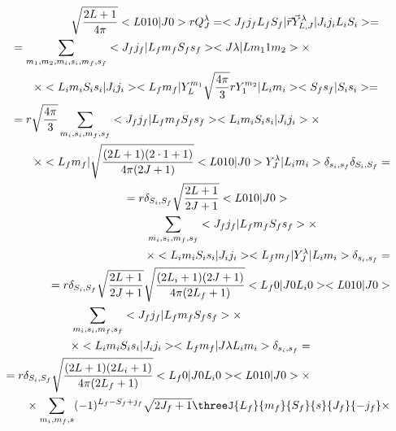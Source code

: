 \begin{align}
    \begin{split}
        &\sqrt{\frac{2L+1}{4\pi}} <L 0 1 0 | J 0> r Q_{J}^\lambda = <J_f j_f L_f S_f|\vec{r} \vec{Y}^{\lambda}_{L, J}|J_i j_i L_i S_i> =
    \end{split} \\
    \begin{split}
        &= \sum_{m_1, m_2, m_i, s_i, m_f, s_f} <J_f j_f| L_f m_f S_f s_f> <J \lambda| L m_1 1 m_2> \times \\
        &\qquad\times <L_i m_i S_i s_i | J_i j_i> <L_f m_f| Y_L^{m_1} \sqrt{\frac{4 \pi}{3}} r Y_{1}^{m_2}|L_i m_i> <S_f s_f|S_i s_i> = \\
        &= r \sqrt{\frac{4 \pi}{3}} \sum_{m_i, s_i, m_f, s_f} <J_f j_f| L_f m_f S_f s_f> <L_i m_i S_i s_i | J_i j_i> \times \\
        &\qquad\times <L_f m_f| \sqrt{\frac{(2L+1)(2\cdot1+1)}{4 \pi (2J + 1)}} <L 0 1 0 | J 0> Y_J^\lambda|L_i m_i> \delta_{s_i, s_f} \delta_{S_i, S_f} = \\
    \end{split} \\
    \begin{split}
        &= r \delta_{S_i, S_f} \sqrt{\frac{2L+1}{2J+1}} <L 0 1 0 | J 0> \\
        &\qquad\sum_{m_i, s_i, m_f, s_f} <J_f j_f| L_f m_f S_f s_f> \times \\
        &\qquad\times <L_i m_i S_i s_i | J_i j_i> <L_f m_f| Y_J^\lambda |L_i m_i> \delta_{s_i, s_f} =
    \end{split} \\
    \begin{split}
        &= r \delta_{S_i, S_f} \sqrt{\frac{2L+1}{2J+1}} \sqrt{\frac{(2L_i+1)(2J+1)}{4 \pi (2L_f+1)}} <L_f 0 | J 0 L_i 0> <L 0 1 0 | J 0> \\
        &\qquad \sum_{m_i, s_i, m_f, s_f} <J_f j_f| L_f m_f S_f s_f> \times \\
        &\qquad\times <L_i m_i S_i s_i | J_i j_i> <L_f m_f| J \lambda L_i m_i> \delta_{s_i, s_f} =
    \end{split} \\
    \begin{split}
        &= r \delta_{S_i, S_f} \sqrt{\frac{(2L+1) (2L_i + 1)}{4 \pi (2L_f+1)}} <L_f 0  | J 0 L_i 0> <L 0 1 0 | J 0> \times \\
        &\qquad\times \sum_{m_i, m_f, s} (-1)^{L_f-S_f + j_f} \sqrt{2J_f+1} \threeJ{L_f}{m_f}{S_f}{s}{J_f}{-j_f} \times \\

\end{split}
\end{align}
